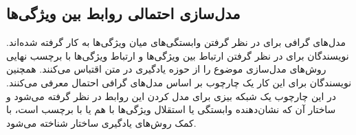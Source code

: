 \subsection{مدل‌سازی احتمالی روابط بین ویژگی‌ها}
مدل‌های گرافی برای در نظر گرفتن وابستگی‌های میان ویژگی‌ها به کار گرفته شده‌اند. نویسندگان \cite{topicmodel} برای در نظر گرفتن ارتباط بین ویژگی‌ها و ارتباط ویژگی‌ها با برچسب نهایی روش‌های مدل‌سازی موضوع  را از حوزه یادگیری در متن اقتباس می‌کنند. همچنین  نویسندگان \cite{unified13} برای این کار یک چارچوب بر اساس مدل‌های گرافی احتمال معرفی می‌کنند. در این چارچوب یک شبکه بیزی  برای مدل کردن این روابط در نظر گرفته می‌شود و ساختار آن که نشان‌دهنده وابستگی یا استقلال ویژگی‌ها با هم یا با برچسب است، با کمک روش‌های یادگیری ساختار
شناخته می‌شود.

